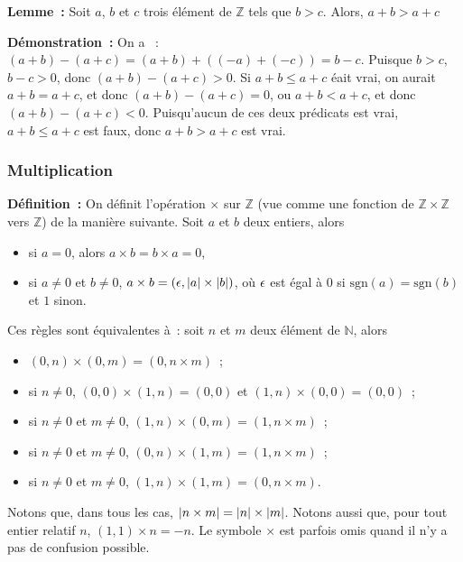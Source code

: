 \medskip

\noindent\textbf{Lemme :} Soit $a$, $b$ et $c$ trois élément de $\mathbb{Z}$ tels que $b > c$.
    Alors, $a + b > a + c$

\medskip

\noindent\textbf{Démonstration :} 
    On a  : $(a + b) - (a + c) = (a + b) + ((-a) + (-c)) = b - c$. 
    Puisque $b > c$, $b - c > 0$, donc $(a + b) - (a + c) > 0$.
    Si $a + b \leq a + c$ éait vrai, on aurait $a + b = a + c$, et donc $(a + b) - (a + c) = 0$, ou $a + b < a + c$, et donc $(a + b) - (a + c) < 0$. 
    Puisqu'aucun de ces deux prédicats est vrai, $a + b \leq a + c$ est faux, donc $a + b > a + c$ est vrai.

    \done

\subsubsection{Multiplication}

\noindent\textbf{Définition :} 
    On définit l'opération $\times$ sur $\mathbb{Z}$ (vue comme une fonction de $\mathbb{Z} \times \mathbb{Z}$ vers $\mathbb{Z}$) de la manière suivante.
    Soit $a$ et $b$ deux entiers, alors
    \begin{itemize}[nosep]
        \item si $a = 0$, alors $a \times b = b \times a = 0$,
        \item si $a \neq 0$ et $b \neq 0$, $a \times b = (\epsilon, \left\lvert a \right\rvert \times \left\lvert b \right\rvert)$, où $\epsilon$ est égal à $0$ si $\mathrm{sgn}(a) = \mathrm{sgn}(b)$ et $1$ sinon.
    \end{itemize}
    Ces règles sont équivalentes à : soit $n$ et $m$ deux élément de $\mathbb{N}$, alors 
    \begin{itemize}[nosep]
        \item $(0,n) \times (0,m) = (0, n \times m)$ ;
        \item si $n \neq 0$, $(0,0) \times (1,n) = (0, 0)$ et $(1, n) \times (0, 0) = (0,0)$ ;
        \item si $n \neq 0$ et $m \neq 0$, $(1,n) \times (0,m) = (1, n \times m)$ ;
        \item si $n \neq 0$ et $m \neq 0$, $(0,n) \times (1,m) = (1, n \times m)$ ;
        \item si $n \neq 0$ et $m \neq 0$, $(1,n) \times (1,m) = (0, n \times m)$. 
    \end{itemize}
    Notons que, dans tous les cas, $\left\lvert n \times m \right\rvert = \left\lvert n \right\rvert \times \left\lvert m \right\rvert$.
    Notons aussi que, pour tout entier relatif $n$, $(1,1) \times n = -n$.
    Le symbole $\times$ est parfois omis quand il n'y a pas de confusion possible.


